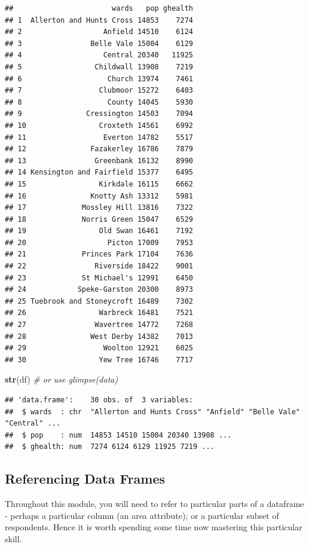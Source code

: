 \documentclass[
]{book}
\newenvironment{Shaded}{\begin{snugshade}}{\end{snugshade}}
\newcommand{\CommentTok}[1]{\textcolor[rgb]{0.56,0.35,0.01}{\textit{#1}}}
\newcommand{\KeywordTok}[1]{\textcolor[rgb]{0.13,0.29,0.53}{\textbf{#1}}}
\newcommand{\NormalTok}[1]{#1}
\begin{document}
\begin{verbatim}
##                       wards   pop ghealth
## 1  Allerton and Hunts Cross 14853    7274
## 2                   Anfield 14510    6124
## 3                Belle Vale 15004    6129
## 4                   Central 20340   11925
## 5                 Childwall 13908    7219
## 6                    Church 13974    7461
## 7                  Clubmoor 15272    6403
## 8                    County 14045    5930
## 9               Cressington 14503    7094
## 10                 Croxteth 14561    6992
## 11                  Everton 14782    5517
## 12               Fazakerley 16786    7879
## 13                Greenbank 16132    8990
## 14 Kensington and Fairfield 15377    6495
## 15                 Kirkdale 16115    6662
## 16               Knotty Ash 13312    5981
## 17             Mossley Hill 13816    7322
## 18             Norris Green 15047    6529
## 19                 Old Swan 16461    7192
## 20                   Picton 17009    7953
## 21             Princes Park 17104    7636
## 22                Riverside 18422    9001
## 23             St Michael's 12991    6450
## 24            Speke-Garston 20300    8973
## 25 Tuebrook and Stoneycroft 16489    7302
## 26                 Warbreck 16481    7521
## 27                Wavertree 14772    7268
## 28               West Derby 14382    7013
## 29                  Woolton 12921    6025
## 30                 Yew Tree 16746    7717
\end{verbatim}

\begin{Shaded}
\begin{Highlighting}[]
\KeywordTok{str}\NormalTok{(df) }\CommentTok{# or use glimpse(data) }
\end{Highlighting}
\end{Shaded}

\begin{verbatim}
## 'data.frame':    30 obs. of  3 variables:
##  $ wards  : chr  "Allerton and Hunts Cross" "Anfield" "Belle Vale" "Central" ...
##  $ pop    : num  14853 14510 15004 20340 13908 ...
##  $ ghealth: num  7274 6124 6129 11925 7219 ...
\end{verbatim}

\hypertarget{referencing-data-frames}{%
\subsection{Referencing Data Frames}\label{referencing-data-frames}}

Throughout this module, you will need to refer to particular parts of a dataframe - perhaps a particular column (an area attribute); or a particular subset of respondents. Hence it is worth spending some time now mastering this particular skill.
\end{document}
